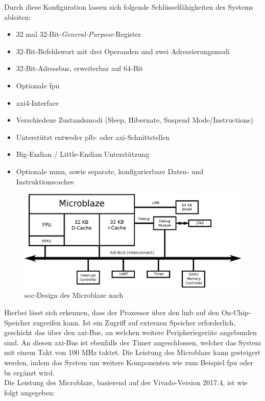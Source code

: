 Durch diese Konfiguration lassen sich folgende Schlüsselfähigkeiten des Systems ableiten:\\
\begin{itemize}
  \item 32 mal 32-Bit-\emph{General-Purpose}-Register
  \item 32-Bit-Befehlswort mit drei Operanden und zwei Adressierungsmodi
  \item 32-Bit-Adressbus, erweiterbar auf 64-Bit
  \item Optionale \ac{fpu}
  \item \ac{axi}4-Interface
  \item Verschiedene Zustandsmodi (Sleep, Hibernate, Suspend Mode/Instructions)
  \item Unterstützt entweder \ac{plb}- oder \ac{axi}-Schnittstellen
  \item Big-Endian / Little-Endian Unterstützung
  \item Optionale \ac{mmu}, sowie separate, konfigurierbare Daten- und Instruktionscaches
\end{itemize}



\begin{figure}[H]
\centering
\includegraphics[width=1\textwidth]{Hauptteil/microblaze.eps}
\caption{\ac{soc}-Design des Microblaze nach~\cite{comparison}}
\label{fig:microblaze}
\end{figure}

Hierbei lässt sich erkennen, dass der Prozessor über den \ac{lmb} auf den On-Chip-Speicher zugreifen kann.
Ist ein Zugriff auf externen Speicher erforderlich,
geschieht das über den \ac{axi}-Bus, an welchen weitere Peripheriegeräte angebunden sind. An diesen \ac{axi}-Bus
ist ebenfalls der Timer angeschlossen, welcher das System mit einem Takt von
100 MHz taktet. Die Leistung des Microblaze kann gesteigert werden, indem das System um weitere Komponenten
 wie zum Beispiel \ac{fpu} oder \ac{bs} ergänzt wird.\\
Die Leistung des Microblaze, basierend auf der Vivado-Version 2017.4, ist wie folgt angegeben:~\cite{microblaze}\\


